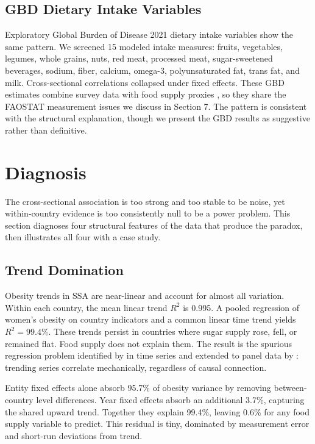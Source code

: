 \documentclass[letterpaper,11pt,leqno]{article}
\begin{document}
\subsection{GBD Dietary Intake Variables}

Exploratory Global Burden of Disease 2021 dietary intake variables show the same pattern. We screened 15 modeled intake measures: fruits, vegetables, legumes, whole grains, nuts, red meat, processed meat, sugar-sweetened beverages, sodium, fiber, calcium, omega-3, polyunsaturated fat, trans fat, and milk. Cross-sectional correlations collapsed under fixed effects. These GBD estimates combine survey data with food supply proxies \citep{gbd2019}, so they share the FAOSTAT measurement issues we discuss in Section 7. The pattern is consistent with the structural explanation, though we present the GBD results as suggestive rather than definitive.

\section{Diagnosis}

The cross-sectional association is too strong and too stable to be noise, yet within-country evidence is too consistently null to be a power problem. This section diagnoses four structural features of the data that produce the paradox, then illustrates all four with a case study.

\subsection{Trend Domination}

Obesity trends in SSA are near-linear and account for almost all variation. Within each country, the mean linear trend $R^2$ is 0.995. A pooled regression of women's obesity on country indicators and a common linear time trend yields $R^2 = 99.4\%$. These trends persist in countries where sugar supply rose, fell, or remained flat. Food supply does not explain them. The result is the spurious regression problem identified by \citet{granger1974} in time series and extended to panel data by \citet{kao1999}: trending series correlate mechanically, regardless of causal connection.

Entity fixed effects alone absorb 95.7\% of obesity variance by removing between-country level differences. Year fixed effects absorb an additional 3.7\%, capturing the shared upward trend. Together they explain 99.4\%, leaving 0.6\% for any food supply variable to predict. This residual is tiny, dominated by measurement error and short-run deviations from trend.
\end{document}
